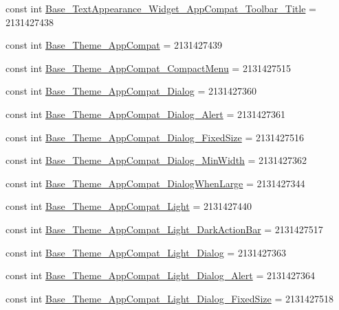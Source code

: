 \begin{CompactItemize}
\item 
const int \hyperlink{class__2doo_1_1_droid_1_1_resource_1_1_style_6e6e98de22df79da02513b669a0bd68b}{Base\_\-TextAppearance\_\-Widget\_\-AppCompat\_\-Toolbar\_\-Title} = 2131427438
\item 
const int \hyperlink{class__2doo_1_1_droid_1_1_resource_1_1_style_e4df31b0e944c1abdc67585679d878b8}{Base\_\-Theme\_\-AppCompat} = 2131427439
\item 
const int \hyperlink{class__2doo_1_1_droid_1_1_resource_1_1_style_525d8d754681ff7802b36bba551ac79f}{Base\_\-Theme\_\-AppCompat\_\-CompactMenu} = 2131427515
\item 
const int \hyperlink{class__2doo_1_1_droid_1_1_resource_1_1_style_9738c778caa2f1d0a817cd67175977d7}{Base\_\-Theme\_\-AppCompat\_\-Dialog} = 2131427360
\item 
const int \hyperlink{class__2doo_1_1_droid_1_1_resource_1_1_style_ac3e4f8cf5b88a0de08992a997db22e9}{Base\_\-Theme\_\-AppCompat\_\-Dialog\_\-Alert} = 2131427361
\item 
const int \hyperlink{class__2doo_1_1_droid_1_1_resource_1_1_style_5e1821dfebefbc9904ec9fc0d065f3c0}{Base\_\-Theme\_\-AppCompat\_\-Dialog\_\-FixedSize} = 2131427516
\item 
const int \hyperlink{class__2doo_1_1_droid_1_1_resource_1_1_style_68abf8e2295c999aba013db0a8f46425}{Base\_\-Theme\_\-AppCompat\_\-Dialog\_\-MinWidth} = 2131427362
\item 
const int \hyperlink{class__2doo_1_1_droid_1_1_resource_1_1_style_be5d1512559e8782c92f91422c44b574}{Base\_\-Theme\_\-AppCompat\_\-DialogWhenLarge} = 2131427344
\item 
const int \hyperlink{class__2doo_1_1_droid_1_1_resource_1_1_style_b226b1f1b9d2bb85db507b9531b62057}{Base\_\-Theme\_\-AppCompat\_\-Light} = 2131427440
\item 
const int \hyperlink{class__2doo_1_1_droid_1_1_resource_1_1_style_5a2dae36a8970c8013d15fbcdb279ebf}{Base\_\-Theme\_\-AppCompat\_\-Light\_\-DarkActionBar} = 2131427517
\item 
const int \hyperlink{class__2doo_1_1_droid_1_1_resource_1_1_style_94af82c594000e2007d80cf60ee68e73}{Base\_\-Theme\_\-AppCompat\_\-Light\_\-Dialog} = 2131427363
\item 
const int \hyperlink{class__2doo_1_1_droid_1_1_resource_1_1_style_a8099b5995f97fe482ad12115f9b81c8}{Base\_\-Theme\_\-AppCompat\_\-Light\_\-Dialog\_\-Alert} = 2131427364
\item 
const int \hyperlink{class__2doo_1_1_droid_1_1_resource_1_1_style_f43df3df34029faeeb9e6b60c45718b0}{Base\_\-Theme\_\-AppCompat\_\-Light\_\-Dialog\_\-FixedSize} = 2131427518

\end{CompactItemize}
